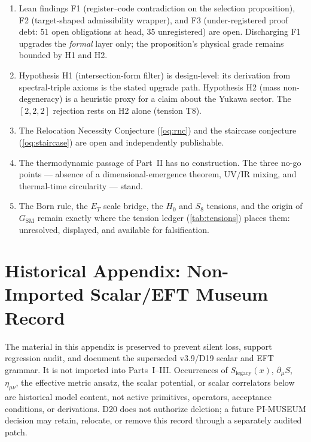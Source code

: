 \documentclass[12pt,a4paper,twoside]{article}
\theoremstyle{plain}
\theoremstyle{definition}
\theoremstyle{remark}
\newcommand{\LegacySx}{S_{\mathrm{legacy}}(x)} %
\begin{document}
\begin{enumerate}[leftmargin=1.6em,itemsep=0.25em]
\item Lean findings F1 (register--code contradiction on the selection
proposition), F2 (target-shaped admissibility wrapper), and F3
(under-registered proof debt: 51 open obligations at head, 35
unregistered) are open. Discharging F1 upgrades the \emph{formal} layer
only; the proposition's physical grade remains bounded by H1 and H2.
\item Hypothesis H1 (intersection-form filter) is design-level: its
derivation from spectral-triple axioms is the stated upgrade path.
Hypothesis H2 (mass non-degeneracy) is a heuristic proxy for a claim
about the Yukawa sector. The $[2,2,2]$ rejection rests on H2 alone
(tension T8).
\item The Relocation Necessity Conjecture (\cref{oq:rnc}) and the
staircase conjecture (\cref{oq:staircase}) are open and independently
publishable.
\item The thermodynamic passage of Part~II has no construction. The
three no-go points --- absence of a dimensional-emergence theorem,
UV/IR mixing, and thermal-time circularity --- stand.
\item The Born rule, the $E_T$ scale bridge, the $H_0$ and $S_8$
tensions, and the origin of $G_{\mathrm{SM}}$ remain exactly where the
tension ledger (\cref{tab:tensions}) places them: unresolved, displayed,
and available for falsification.
\end{enumerate}


\clearpage
\appendix
\toggletrue{museumwatermark}
\part*{Historical Appendix: Non-Imported Scalar/EFT Museum Record}

\begin{governancebox}
The material in this appendix is preserved to prevent silent loss, support
regression audit, and document the superseded v3.9/D19 scalar and EFT grammar.
It is not imported into Parts~I--III. Occurrences of
$\LegacySx$, $\partial_\mu S$, $\eta_{\mu\nu}$, the effective metric ansatz,
the scalar potential, or scalar correlators below are historical model content,
not active primitives, operators, acceptance conditions, or derivations. D20
does not authorize deletion; a future PI-MUSEUM decision may retain, relocate,
or remove this record through a separately audited patch.
\end{governancebox}
\end{document}
